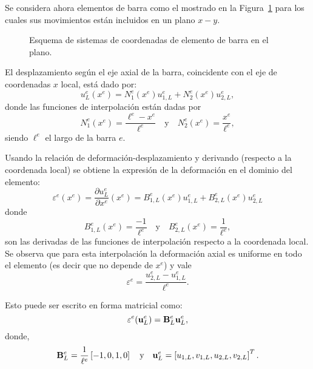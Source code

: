 Se considera ahora elementos de barra como el mostrado en la Figura~\ref{fig:eleplabar} para los cuales sus movimientos están incluidos en un plano $x-y$. %
%
\begin{figure}[htb]
	\centering
  \def\svgwidth{0.7\textwidth}
  
	\caption{Esquema de sistemas de coordenadas de elemento de barra en el plano.}
	\label{fig:eleplabar}
\end{figure}

El desplazamiento según el eje axial de la barra, coincidente con el eje de coordenadas $x$ local, está dado por:
%
\begin{equation}
u_L^e(x^e) = N_1^e(x^e) u_{1,L}^e  + N_2^e(x^e) u_{2,L}^e,
\end{equation}
%
donde las funciones de interpolación están dadas por
%
\begin{equation}
N_1^e(x^e) = \frac{\ell^e - x^e}{\ell^e}
\quad \text{y} \quad N_2^e(x^e) = \frac{x^e}{\ell^e},
\end{equation}
%
siendo $\ell^e$ el largo de la barra $e$.


%
Usando la relación de deformación-desplazamiento y derivando (respecto a la coordenada local) se obtiene la expresión de la deformación en el dominio del elemento:
%
\begin{equation}
\varepsilon^e(x^e) = \frac{\partial u^e_L}{\partial x^e}(x^e) =  B_{1,L}^e(x^e) u_{1,L}^e  + B_{2,L}^e(x^e) u_{2,L}^e
\end{equation}
%
donde 
\begin{equation}
B_{1,L}^e(x^e) = \frac{- 1}{\ell^e}
\quad \text{y} \quad B_{2,L}^e(x^e) = \frac{1}{\ell^e},
\end{equation}
son las derivadas de las funciones de interpolación respecto a la coordenada local. %
%
Se observa que para esta interpolación la deformación axial es uniforme en todo el elemento (es decir que no depende de $x^e$) y vale 
%
\begin{equation}
\varepsilon^e  =  \frac{ u_{2,L}^e - u_{1,L}^e } {\ell^e}.
\end{equation}


Esto puede ser escrito en forma matricial como:
%
\begin{equation} \label{eqn:expreps}
\varepsilon^e ({\bf u}^e_L) = {\bf B}_L^e {\bf u}^e_L,
\end{equation}
%
donde,
%
\begin{equation}
{\bf B}_L^e = \frac{1}{\ell^e} \left[-1, 0, 1, 0\right]
\quad \text{y} \quad
{\bf u}_L^e = \left[u_{1,L}, v_{1,L}, u_{2,L}, v_{2,L}\right]^T.
\end{equation}

